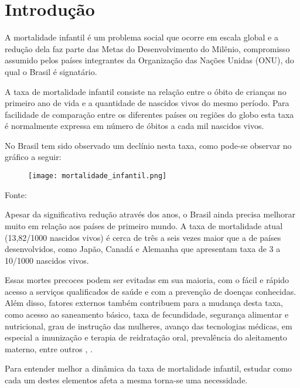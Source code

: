 \chapter{Introdução}
A mortalidade infantil é um problema social que ocorre em escala global e a redução
dela faz parte das Metas do Desenvolvimento do Milênio, compromisso assumido pelos países
integrantes da Organização das Nações Unidas (ONU), do qual o Brasil é signatário.

A taxa de mortalidade infantil consiste na relação entre o óbito de crianças no primeiro ano
de vida e a quantidade de nascidos vivos do mesmo período. Para facilidade de comparação entre
os diferentes países ou regiões do globo esta taxa é normalmente expressa em número de óbitos a
cada mil nascidos vivos.

No Brasil tem sido observado um declínio nesta taxa, como pode-se observar no gráfico a seguir:

\begin{center}
\begin{figure}[h]
  \texttt{[image: mortalidade\_infantil.png]}
\end{figure}
Fonte: \cite{ibgeMortalidade}
\end{center}

Apesar da significativa redução através dos anos, o Brasil ainda precisa melhorar
muito em relação aos países de primeiro mundo. A taxa de mortalidade atual (13,82/1000 nascidos vivos)
é cerca de três a seis vezes maior que a de países desenvolvidos, como Japão, Canadá e Alemanha que
apresentam taxa de 3 a 10/1000 nascidos vivos.

Essas mortes precoces podem ser evitadas em sua maioria, com o fácil e rápido acesso a serviços
qualificados de saúde e com a prevenção de doenças conhecidas. Além disso, fatores externos também
contribuem para a mudança desta taxa, como acesso ao  saneamento básico, taxa de fecundidade,
segurança alimentar e nutricional, grau de instrução das mulheres, avanço das tecnologias médicas,
em especial a imunização e terapia de reidratação oral, prevalência do aleitamento materno,
entre outros \cite{lansky2009mortalidade}, \cite{frias2008politicas}.

Para entender melhor a dinâmica da taxa de mortalidade infantil, estudar como cada um destes elementos
afeta a mesma torna-se uma necessidade.

